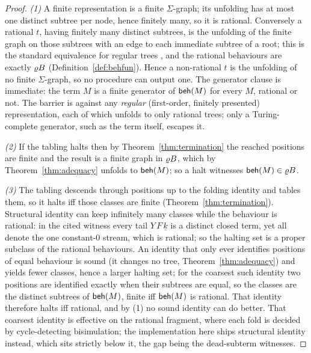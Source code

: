 \begin{proof}
  \emph{(1)} A finite representation is a finite $\Sigma$-graph; its unfolding has at most one distinct
  subtree per node, hence finitely many, so it is rational. Conversely a rational $t$, having finitely
  many distinct subtrees, is the unfolding of the finite graph on those subtrees with an edge to each
  immediate subtree of a root; this is the standard equivalence for regular trees ,
  and the rational behaviours are exactly $\varrho B$ (Definition~\ref{def:behfun}). Hence a non-rational
  $t$ is the unfolding of no finite $\Sigma$-graph, so no procedure can output one. The generator clause
  is immediate: the term $M$ is a finite generator of $\mathsf{beh}(M)$ for every $M$, rational or not. The
  barrier is against any \emph{regular} (first-order, finitely presented) representation, each of which
  unfolds to only rational trees; only a Turing-complete generator, such as the term itself, escapes it.

  \emph{(2)} If the tabling halts then by Theorem~\ref{thm:termination} the reached positions are finite
  and the result is a finite graph in $\varrho B$, which by Theorem~\ref{thm:adequacy} unfolds to
  $\mathsf{beh}(M)$; so a halt witnesses $\mathsf{beh}(M) \in \varrho B$.

  \emph{(3)} The tabling descends through positions up to the folding identity and tables them, so it
  halts iff those classes are finite (Theorem~\ref{thm:termination}). Structural identity can keep
  infinitely many classes while the behaviour is rational: in the cited witness every tail
  $Y\,F\,\underline{k}$ is a distinct closed term, yet all denote the one constant-$0$ stream, which is
  rational; so the halting set is a proper subclass of the rational behaviours. An identity that only
  ever identifies positions of equal behaviour is sound (it changes no tree, Theorem~\ref{thm:adequacy})
  and yields fewer classes, hence a larger halting set; for the coarsest such identity two positions are
  identified exactly when their subtrees are equal, so the classes are the distinct subtrees of
  $\mathsf{beh}(M)$, finite iff $\mathsf{beh}(M)$ is rational. That identity therefore halts iff rational, and by (1)
  no sound identity can do better. That coarsest identity is effective on the rational fragment, where
  each fold is decided by cycle-detecting bisimulation; the implementation here ships structural identity
  instead, which sits strictly below it, the gap being the dead-subterm witnesses.
\end{proof}

